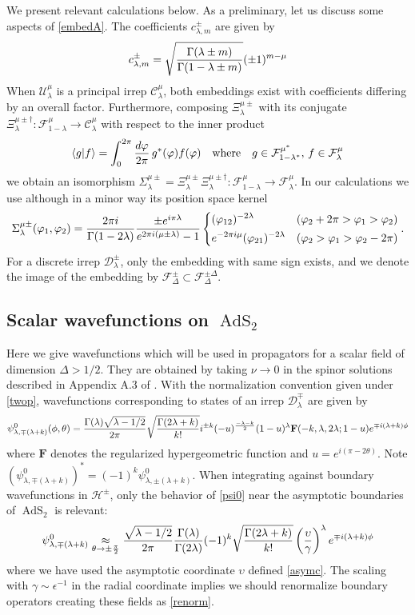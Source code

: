 \documentclass[12pt]{article}
\newcommand{\be}{\begin{equation}}
\newcommand{\ee}{\end{equation}}
\newcommand{\hgfs}{\mathbf{F}}
\newcommand*{\corr}[1]{\langle{#1}\rangle}
\newcommand{\vp}{\varphi}
\newcommand{\calC}{\mathcal{C}}
\newcommand{\calD}{\mathcal{D}}
\newcommand{\calF}{\mathcal{F}}
\newcommand{\calH}{\mathcal{H}}
\newcommand{\calU}{\mathcal{U}}
\DeclareMathOperator{\tAdS}{\widetilde{AdS}}
\newcommand{\ep}{\epsilon}
\newcommand{\tht}{\theta}
\newcommand{\Sig}{\Sigma}
\newcommand{\lam}{\lambda}
\newcommand{\ga}{\gamma}
\newcommand{\Ga}{\Gamma}
\newcommand{\De}{\Delta}
\newcommand{\ov}{\over}
\def\widetilde#1{#1}%
\begin{document}
We present relevant calculations below. As a preliminary, let us discuss some aspects of \eqref{embedA}. The coefficients $c^{\pm}_{\lam, m}$ are given by
\be \label{coeff}
c^{\pm}_{\lam, m}=\sqrt{\Ga(\lam \pm m) \ov \Ga(1-
\lam \pm m)}(\pm 1)^{m-\mu}
\ee
When $\calU^{\mu}_{\lam}$ is a principal irrep $\calC^{\mu}_{\lam}$, both embeddings exist with coefficients differing by an overall factor. Furthermore, composing $\Xi^{\mu \pm}_{\lam}$ with its conjugate $\Xi_{\lam}^{\mu\pm \dagger}: \calF_{1-\lam}^{\mu} \to \calC^{\mu}_{\lam}$ with respect to the inner product 
\be
\corr{g| f}=\int_{0}^{2\pi}{d\vp \ov 2 \pi}\, g^*(\vp)f(\vp) \quad \text{where}\quad g\in \calF^{\mu^*}_{1-\lam^*}, \, f \in \calF_{\lam}^{\mu}
\ee
we obtain an isomorphism $\Sig_{\lam}^{\mu \pm}=\Xi_{\lam}^{\mu\pm}\Xi_{\lam}^{\mu\pm \dagger}: \calF_{1-\lam}^{\mu} \to \calF_{\lam}^{\mu}$. In our calculations we use although in a minor way its position space kernel
\be
\Sig_{\lam}^{\mu\pm}(\vp_1, \vp_2)={2\pi i \ov \Ga(1-2\lam)}{\pm e^{i \pi \lam} \ov e^{2\pi i (\mu \pm \lam)}-1}\begin{dcases}(\vp_{12})^{-2\lam} & (\vp_2+2\pi > \vp_1 > \vp_2)\\
e^{- 2\pi i \mu}(\vp_{21})^{-2\lam} & (\vp_2 > \vp_1 > \vp_2-2\pi)
\end{dcases}.
\ee
For a discrete irrep $\calD^{\pm}_{\lam}$, only the embedding with same sign exists, and we denote the image of the embedding by $\calF_{\De}^{\pm}\subset \calF_{\De}^{\pm \De}$.

\subsection{Scalar wavefunctions on $\tAdS_2$} \label{app:scwf}

Here we give wavefunctions which will be used in propagators for a scalar field of dimension $\De>1/2$. They are obtained by taking $\nu \to 0$ in the spinor solutions described in Appendix A.3 of \cite{KiSuh18}. With the normalization convention given under \eqref{twop}, wavefunctions corresponding to states of an irrep $\calD^{\mp}_{\lam}$ are given by
\be \label{psi0}
\psi^{0}_{\lam, \mp(\lam+k)}(\phi, \tht)={\Ga(\lam) \sqrt{\lam-1/2} \ov 2 \pi}\sqrt{{\Ga(2\lam+k)} \ov k!}i^{\pm k}(-u)^{-\lam-k \ov 2}(1-u)^{\lam}\hgfs(-k, \lam,2\lam; 1-u)e^{\mp i(\lam+k)\phi}
\ee
where $\hgfs$ denotes the regularized hypergeometric function and $u=e^{i (\pi-2 \tht)}$. Note $\left(\psi^0_{\lam, \mp (\lam+k)}\right)^*=(-1)^k \psi^0_{\lam, \pm (\lam+k)}$. When integrating against boundary wavefunctions in $\calH^{\pm}$, only the behavior of \eqref{psi0} near the asymptotic boundaries of $\tAdS_2$ is relevant:
\be \label{psi0asym}
\psi^{0}_{\lam, \mp(\lam+k)} \underset{\tht \to \pm {\pi \ov 2}}{\approx}{\sqrt{\lam-1/2} \ov 2 \pi}{\Ga(\lam) \ov \Ga(2\lam)}(-1)^k \sqrt{{\Ga(2\lam+k)  \ov k!}}\left({\upsilon \ov \ga}\right)^{\lam}e^{\mp i (\lam+k)\phi}
\ee
where we have used the asymptotic coordinate $\upsilon$ defined \eqref{asymc}. The scaling with $\ga \sim \ep^{-1}$ in the radial coordinate implies we should renormalize boundary operators creating these fields as \eqref{renorm}.
\end{document}

